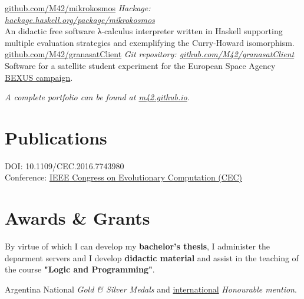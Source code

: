\documentclass[nocolors]{friggeri-cv-a4}
\begin{document}
\begin{entrylist}
{\href{https://github.com/M42/mikrokosmos}{github.com/M42/mikrokosmos}}
{\emph{Hackage: \href{https://hackage.haskell.org/package/mikrokosmos}{hackage.haskell.org/package/mikrokosmos}} \\
  An didactic free software λ-calculus interpreter written in Haskell supporting multiple evaluation strategies and exemplifying the Curry-Howard isomorphism.
}
{\href{https://github.com/M42/granasatClient}{github.com/M42/granasatClient}}
{\emph{Git repository: \href{https://github.com/M42/granasatClient}{github.com/M42/granasatClient}} \\
  Software for a satellite student experiment for the
  European Space Agency \href{http://rexusbexus.net/}{BEXUS campaign}.
}
\end{entrylist}

\textit{A complete portfolio can be found at \href{https://m42.github.io}{m42.github.io}.}

\section{Publications}

\begin{entrylist}
  {
    DOI: 10.1109/CEC.2016.7743980 \\
    Conference: \href{http://ieeexplore.ieee.org/document/7743980/2016}{IEEE Congress on Evolutionary Computation (CEC)}
    }
\end{entrylist}

\section{Awards \& Grants}

\begin{entrylist}

  {By virtue of which I can develop my \textbf{bachelor's thesis}, I administer the deparment
    servers and I develop \textbf{didactic material} and assist in the teaching of the course
    \textbf{"Logic and Programming"}.
  }

  
{Argentina}
{National \emph{Gold \& Silver Medals} and
  \href{https://www.imo-official.org/team_r.aspx?code=ESP&year=2012}{international} \emph{Honourable mention}.}


\end{entrylist}
\end{document}
